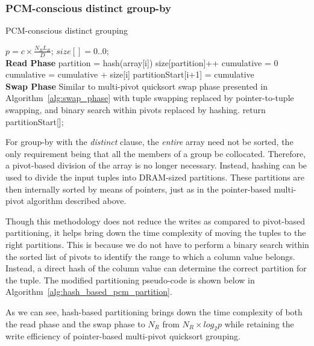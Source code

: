 \subsubsection{PCM-conscious distinct group-by}
\begin{algorithm}[h!]
\caption{PCM-conscious distinct grouping}
\label{alg:hash_based_pcm_partition}
\begin{algorithmic}[1]
\State $ p = c\times \frac{N_R L_R}{D}$;
\State $ size[] = {0..0}$;   
\\
\textbf{Read Phase}
\State partition = hash(array[i]) 
\State size[partition]++ 
\EndFor
{}
\State cumulative = 0
\State cumulative = cumulative + size[i]
\State partitionStart[i+1] = cumulative
\EndFor
{}\\
\textbf{Swap Phase}
\State Similar to multi-pivot quicksort swap phase presented in Algorithm~\ref{alg:swap_phase} with tuple swapping replaced by pointer-to-tuple swapping, and binary search within pivots replaced by hashing.
\State return partitionStart[];
\end{algorithmic}
\end{algorithm} 
For group-by with the \textit{distinct} clause, the \emph{entire} array
need not be sorted, the only requirement being that all the members of a
group be collocated. Therefore, a pivot-based division of the array is no
longer necessary. Instead, hashing can be used to divide the input tuples
into DRAM-sized partitions. These partitions are then internally sorted by means
of pointers, just as in the pointer-based multi-pivot algorithm described above. 

Though this methodology does not reduce the writes as compared to 
pivot-based partitioning, it helps bring down the time complexity of
moving the tuples to the right partitions. This is because we do not have
to perform a binary search within the sorted list of pivots to identify
the range to which a column value belongs. Instead, a direct
hash of the column value can determine the correct partition for
the tuple. The modified partitioning pseudo-code is shown below
in Algorithm~\ref{alg:hash_based_pcm_partition}.



As we can see, hash-based partitioning brings down the time complexity
of both the read phase and the swap phase to $N_R$ from $N_R \times
log_2p$ while retaining the write efficiency of pointer-based multi-pivot
quicksort grouping.


